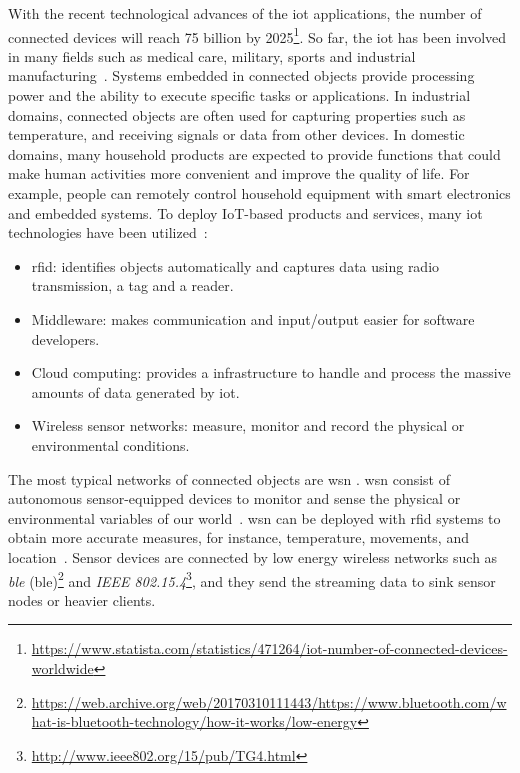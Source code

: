With the recent technological advances of the \acrfull{iot} applications, the
number of connected devices will reach 75 billion by
2025\footnote{\url{https://www.statista.com/statistics/471264/iot-number-of-connected-devices-worldwide}}.
So far, the \acrshort{iot} has been involved in many fields such as medical
care, military, sports and industrial
manufacturing~\cite{boudargham2017exhaustive, lai2013survey, da2014internet}.
Systems embedded in connected objects provide processing power and the ability to execute
specific tasks or applications. In industrial domains, connected objects are
often used for capturing properties such as temperature, and receiving signals
or data from other devices. In domestic domains, many household products are
expected to provide functions that could make human activities more
convenient and improve the quality of life. For example, people can remotely
control household equipment with smart electronics and embedded systems. To
deploy IoT-based products and services, many \acrshort{iot} technologies have
been utilized~\cite{lee2015internet}:
\begin{itemize}
    \item \acrfull{rfid}: identifies objects automatically
    and captures data using radio transmission, a tag and a reader.
    \item Middleware: makes communication and input/output  easier for software
    developers.
    \item Cloud computing: provides a infrastructure to handle and process the massive
    amounts of data generated by \acrshort{iot}.
    \item Wireless sensor networks: measure, monitor and record the physical
    or environmental conditions. 
\end{itemize}

The most typical networks of connected objects are \acrfull{wsn} . \acrshort{wsn}
consist of autonomous sensor-equipped devices to monitor and sense the physical
or environmental variables of our world~\cite{lee2015internet, li2016temporal}.
\acrshort{wsn} can be deployed with \acrshort{rfid} systems to obtain more
accurate measures, for instance, temperature, movements, and
location~\cite{lee2015internet, atzori2010b}. Sensor devices are connected by
low energy wireless networks such as \emph{\acrlong{ble}}
(\acrshort{ble})\footnote{\url{https://web.archive.org/web/20170310111443/https://www.bluetooth.com/what-is-bluetooth-technology/how-it-works/low-energy}}
and \emph{IEEE 802.15.4}\footnote{\url{http://www.ieee802.org/15/pub/TG4.html}},
and they send the streaming data to sink sensor nodes or heavier clients.


